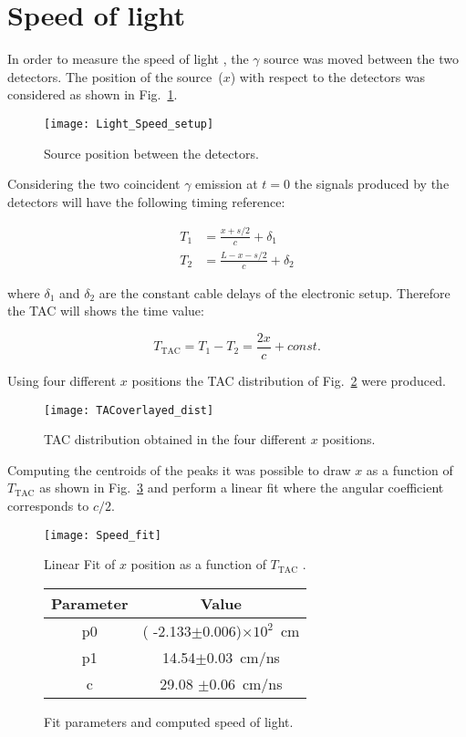 \section*{Speed of light}
In order to measure the speed of light , the $\gamma$ source was moved between the two detectors. The position of the source~($x$) with respect to the detectors was considered as shown in Fig.~\ref{Fig:Src_pos}.
\begin{figure}[h!]
	\centering
	\texttt{[image: Light\_Speed\_setup]}
	\caption{Source position between the detectors.}
	\label{Fig:Src_pos}
\end{figure}

Considering the two coincident $\gamma$ emission at $t=0$ the signals produced by the detectors will have the following timing reference:

\[
\begin{aligned}
T_1 &=\frac{x+s/2}{c}+\delta_1\\
T_2 &=\frac{L-x-s/2}{c}+\delta_2
\end{aligned}
\]

where $\delta_1$ and $\delta_2$ are the constant cable delays of the electronic setup.  Therefore the TAC will shows the time value:

\[
T_{\text{TAC}}=T_1-T_2=\frac{2 x}{c}+const.
\] 

Using four different $x$ positions the  TAC distribution of Fig.~\ref{Fig:TAC_speed_dist} were produced.

\begin{figure}[h]
	\centering
	\texttt{[image: TACoverlayed\_dist]}
	\caption{TAC distribution obtained in the four different $x$ positions.}
	\label{Fig:TAC_speed_dist}
\end{figure}

Computing the centroids of the peaks it was possible to draw $x$ as a function of $T_{\text{TAC}}$ as shown in Fig.~\ref{Fig:Speed_fit} and perform a linear fit where the angular coefficient corresponds to $c/2$.
 
 \begin{figure}[h!]
 	\begin{minipage}[b]{0.6\textwidth}
\centering
\texttt{[image: Speed\_fit]}
\caption{Linear Fit of $x$ position as a function of $T_{\text{TAC}}$ .}
\label{Fig:Speed_fit}
 	\end{minipage}
 	\hfill
 	\begin{minipage}[b]{0.45\textwidth}
 		\centering
 		\begin{tabular}{cc}
 			\toprule
 			\toprule
 			Parameter & Value \\
 			\midrule
 			p0     & ( -2.133$\pm$0.006)$\times 10^2$~cm \\
 			p1     & 14.54$\pm$0.03~cm/ns\\
 			c        & 29.08 $\pm$0.06~cm/ns\\
 			\bottomrule
 			\bottomrule
 		\end{tabular}
 		\vspace{1.45cm}
 		\caption*{Fit parameters and computed speed of light.}
 	\end{minipage}
 \end{figure}

